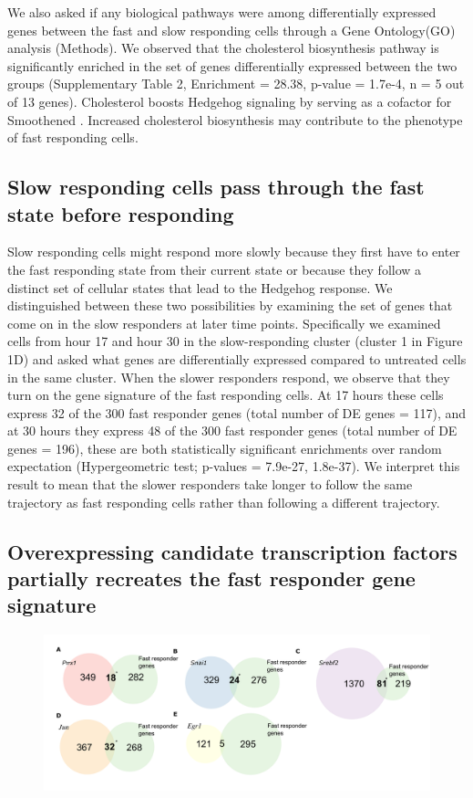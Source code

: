We also asked if any biological pathways were among differentially expressed genes between the fast and slow responding cells through a Gene Ontology(GO) analysis (Methods). We observed that the cholesterol biosynthesis pathway is significantly enriched in the set of genes differentially expressed between the two groups (Supplementary Table 2, Enrichment = 28.38, p-value = 1.7e-4, n = 5 out of 13 genes). Cholesterol boosts Hedgehog signaling by serving as a cofactor for Smoothened \cite{Huang2018-iz,Huang2016-er,Kinnebrew2019-gt,Luchetti2016-cd,Radhakrishnan2020-ii}. Increased cholesterol biosynthesis may contribute to the phenotype of fast responding cells. 


\subsection{Slow responding cells pass through the fast state before responding}

Slow responding cells might respond more slowly because they first have to enter the fast responding state from their current state or because they follow a distinct set of cellular states that lead to the Hedgehog response. We distinguished between these two possibilities by examining the set of genes that come on in the slow responders at later time points. Specifically we examined cells from hour 17 and hour 30 in the slow-responding cluster (cluster 1 in Figure 1D) and asked what genes are differentially expressed compared to untreated cells in the same cluster. When the slower responders respond, we observe that they turn on the gene signature of the fast responding cells. At 17 hours these cells express 32 of the 300 fast responder genes (total number of DE genes = 117), and at 30 hours they express 48 of the 300 fast responder genes (total number of DE genes = 196), these are both statistically significant enrichments over random expectation (Hypergeometric test; p-values = 7.9e-27, 1.8e-37). We interpret this result to mean that the slower responders take longer to follow the same trajectory as fast responding cells rather than following a different trajectory.

\subsection{Overexpressing candidate transcription factors partially recreates the fast responder gene signature}

\begin{figure}[t!]  
    \centering
    \includegraphics[width=\linewidth]{figures/hedgehog/hh_figure2.pdf}
    \caption[]{%
        \textbf{}
    }
    \label{fig:hh_figure2}
\end{figure}

